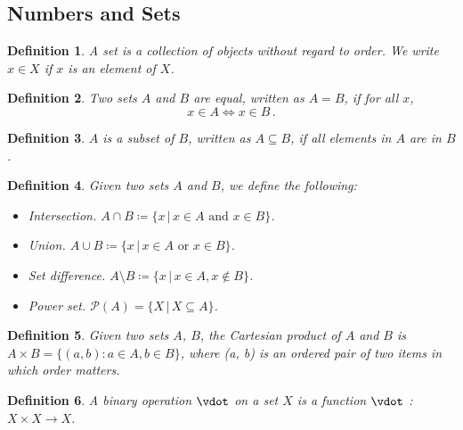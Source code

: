 \documentclass{article}
\theoremstyle{plain}\theoremheaderfont{\normalfont\itshape}\theorembodyfont{\rmfamily}\theoremseparator{.}\newtheorem*{rem}{Remark}\newtheorem*{ex}{Example}\newtheorem*{proof}{Proof}\newtheorem*{altp}{Alternative proof}
\theoremstyle{plain}\theoremheaderfont{\normalfont\bfseries}\theorembodyfont{\rmfamily}\theoremseparator{.}\newtheorem{thm}{Theorem}[section]\newtheorem{lem}[thm]{Lemma}\newtheorem{prop}[thm]{Proposition}\newtheorem*{cor}{Corollary}\newtheorem{defn}[thm]{Definition}\newtheorem{clm}[thm]{Claim}\newtheorem{clminproof}{Claim}
\theoremstyle{break}\theoremheaderfont{\normalfont\itshape}\theorembodyfont{\rmfamily}\theoremseparator{.\medskip}\newtheorem*{proofskip}{Proof}\newtheorem*{exs}{Examples}\newtheorem*{rems}{Remarks}
\theoremstyle{break}\theoremheaderfont{\normalfont\bfseries}\theorembodyfont{\rmfamily}\theoremseparator{.\medskip}\newtheorem{lemskip}[thm]{Lemma}\newtheorem{defnskip}[thm]{Definition}\newtheorem{propskip}[thm]{Proposition}\newtheorem{thmskip}[thm]{Theorem}
\numberwithin{equation}{section}
\begin{document}
	\subsection{Numbers and Sets}
	\begin{defn}
		A \textit{set} is a collection of objects without regard to order. We write \(x\in X\) if \(x\) is an element of \(X\). 
	\end{defn}
	\begin{defn}
		Two sets \(A\) and \(B\) are \textit{equal}, written as \(A = B\), if for all \(x\),
		\[x\in A \iff x \in B\,.\]
	\end{defn}
	\begin{defn}
		\(A\) is a \textit{subset} of \(B\), written as \(A\subseteq B\), if all elements in \(A\) are in \(B\).
	\end{defn}
	\begin{defn}
		Given two sets \(A\) and \(B\), we define the following:
		\begin{itemize}[topsep=0pt]
			\item \textit{Intersection.} \(A\cap B\coloneqq\{x\,|\,x\in A\text{ and }x\in B\}\).
			\item \textit{Union.} \(A\cup B\coloneqq\{x\,|\,x\in A\text{ or }x\in B\}\).
			\item \textit{Set difference.} \(A\setminus B\coloneqq\{x\,|\, x\in A,x\notin B\}\).
			\item \textit{Power set.} \(\mathcal{P}(A)=\{X\,|\,X\subseteq A\}\).
		\end{itemize}
	\end{defn}
	\begin{defn}
		Given two sets \(A\), \(B\), the \textit{Cartesian product} of \(A\) and \(B\) is \(A \times B=\{(a, b) : a\in A, b\in B\}\), where (a, b) is an \textit{ordered pair} of two items in which
		order matters.
	\end{defn}
	\begin{defn}
		A \textit{binary operation} \(\vdot\) on a set \(X\) is a function \(\vdot\) : \(X\times X\to X\).
	\end{defn}
\end{document}

